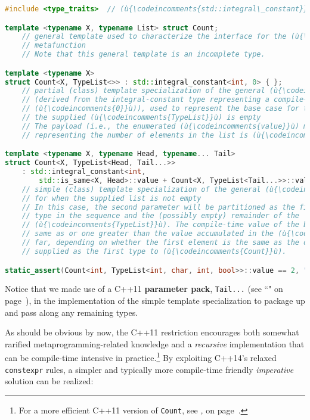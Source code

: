 \begin{lstlisting}[language=C++,label={relaxedconstexpr-countcode}]
#include <type_traits>  // (ù{\codeincomments{std::integral\_constant}}ù), (ù{\codeincomments{std::is\_same}}ù)

template <typename X, typename List> struct Count;
    // general template used to characterize the interface for the (ù{\codeincomments{Count}}ù)
    // metafunction
    // Note that this general template is an incomplete type.

template <typename X>
struct Count<X, TypeList<>> : std::integral_constant<int, 0> { };
    // partial (class) template specialization of the general (ù{\codeincomments{Count}}ù) template
    // (derived from the integral-constant type representing a compile-time
    // (ù{\codeincomments{0}}ù)), used to represent the base case for the recursion --- i.e., when
    // the supplied (ù{\codeincomments{TypeList}}ù) is empty 
    // The payload (i.e., the enumerated (ù{\codeincomments{value}}ù) member of the base class) 
    // representing the number of elements in the list is (ù{\codeincomments{0}}ù).

template <typename X, typename Head, typename... Tail>
struct Count<X, TypeList<Head, Tail...>>
    : std::integral_constant<int,
        std::is_same<X, Head>::value + Count<X, TypeList<Tail...>>::value> { };
    // simple (class) template specialization of the general (ù{\codeincomments{count}}ù) template
    // for when the supplied list is not empty 
    // In this case, the second parameter will be partitioned as the first 
    // type in the sequence and the (possibly empty) remainder of the 
    // (ù{\codeincomments{TypeList}}ù). The compile-time value of the base class will be either the 
    // same as or one greater than the value accumulated in the (ù{\codeincomments{TypeList}}ù) so 
    // far, depending on whether the first element is the same as the one 
    // supplied as the first type to (ù{\codeincomments{Count}}ù).

static_assert(Count<int, TypeList<int, char, int, bool>>::value == 2, "");
\end{lstlisting}
    
\noindent Notice that we made use of a C++11 \textbf{parameter pack},
\texttt{Tail...} (see ``" on page~\pageref{variadictemplate}), in the
implementation of the simple template specialization to package up and
pass along any remaining types.

As should be obvious by now, the C++11 restriction encourages both
somewhat rarified metaprogramming-related knowledge and a
\emph{recursive} implementation that can be compile-time intensive in
practice.{\cprotect\footnote{For a more efficient C++11 version of
\texttt{Count}, see \textit{, } on page~\pageref{constexpr-typelist-count-algorithm}.}} By exploiting C++14's relaxed
\texttt{constexpr} rules, a simpler and typically more compile-time
friendly \emph{imperative} solution can be realized:

